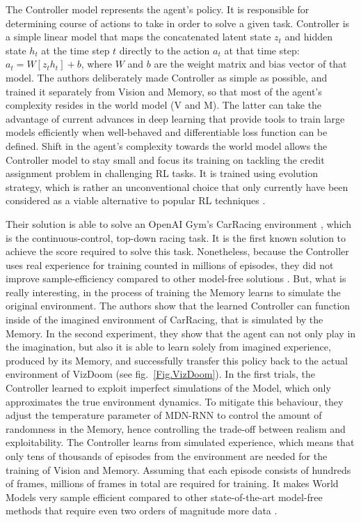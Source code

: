 The Controller model represents the agent's policy. It is responsible for determining course of actions to take in order to solve a given task. Controller is a simple linear model that maps the concatenated latent state $z_t$ and hidden state $h_t$ at the time step $t$ directly to the action $a_t$ at that time step: $a_t = W[z_t h_t] + b$, where $W$ and $b$ are the weight matrix and bias vector of that model.
The authors deliberately made Controller as simple as possible, and trained it separately from Vision and Memory, so that most of the agent's complexity resides in the world model (V and M). The latter can take the advantage of current advances in deep learning that provide tools to train large models efficiently when well-behaved and differentiable loss function can be defined.
Shift in the agent's complexity towards the world model allows the Controller model to stay small and focus its training on tackling the credit assignment problem in challenging RL tasks. It is trained using evolution strategy, which is rather an unconventional choice that only currently have been considered as a viable alternative to popular RL techniques \cite{Algo.ESRL}.

Their solution is able to solve an OpenAI Gym's CarRacing environment \cite{Code.OpenAIGym}, which is the continuous-control, top-down racing task. It is the first known solution to achieve the score required to solve this task. Nonetheless, because the Controller uses real experience for training counted in millions of episodes, they did not improve sample-efficiency compared to other model-free solutions \cite{Algo.CarRacingA3C}. But, what is really interesting, in the process of training the Memory learns to simulate the original environment. The authors show that the learned Controller can function inside of the imagined environment of CarRacing, that is simulated by the Memory.
In the second experiment, they show that the agent can not only play in the imagination, but also it is able to learn solely from imagined experience, produced by its Memory, and successfully transfer this policy back to the actual environment of VizDoom (see fig.~\ref{Fig.VizDoom}). In the first trials, the Controller learned to exploit imperfect simulations of the Model, which only approximates the true environment dynamics. To mitigate this behaviour, they adjust the temperature parameter of MDN-RNN to control the amount of randomness in the Memory, hence controlling the trade-off between realism and exploitability.
The Controller learns from simulated experience, which means that only tens of thousands of episodes from the environment are needed for the training of Vision and Memory. Assuming that each episode consists of hundreds of frames, millions of frames in total are required for training. It makes World Models very sample efficient compared to other state-of-the-art model-free methods that require even two orders of magnitude more data \cite{Algo.A3C}.

